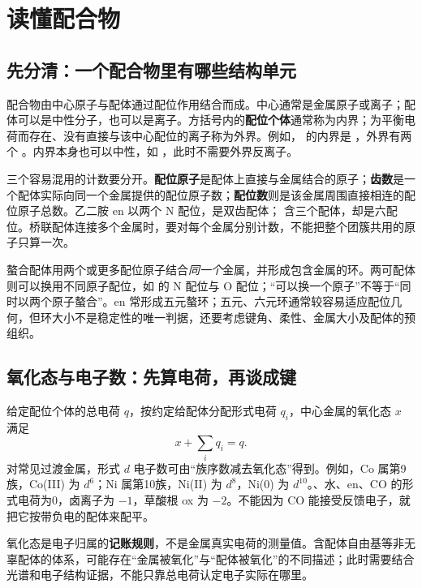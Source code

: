 \section{读懂配合物}

\subsection{先分清：一个配合物里有哪些结构单元}
配合物由中心原子与配体通过配位作用结合而成。中心通常是金属原子或离子；配体可以是中性分子，也可以是离子。方括号内的\textbf{配位个体}通常称为内界；为平衡电荷而存在、没有直接与该中心配位的离子称为外界。例如， 的内界是 ，外界有两个 。内界本身也可以中性，如 \ce{[Ni(CO)4]}，此时不需要外界反离子。

三个容易混用的计数要分开。\textbf{配位原子}是配体上直接与金属结合的原子；\textbf{齿数}是一个配体实际向同一个金属提供的配位原子数；\textbf{配位数}则是该金属周围直接相连的配位原子总数。乙二胺 en 以两个 N 配位，是双齿配体； 含三个配体，却是六配位。桥联配体连接多个金属时，要对每个金属分别计数，不能把整个团簇共用的原子只算一次。

螯合配体用两个或更多配位原子结合\emph{同一个}金属，并形成包含金属的环。两可配体则可以换用不同原子配位，如  的 N 配位与 O 配位；“可以换一个原子”不等于“同时以两个原子螯合”。en 常形成五元螯环；五元、六元环通常较容易适应配位几何，但环大小不是稳定性的唯一判据，还要考虑键角、柔性、金属大小及配体的预组织。

\subsection{氧化态与电子数：先算电荷，再谈成键}
给定配位个体的总电荷 $q$，按约定给配体分配形式电荷 $q_i$，中心金属的氧化态 $x$ 满足
\[
 x+\sum_i q_i=q.
\]
对常见过渡金属，形式 $d$ 电子数可由“族序数减去氧化态”得到。例如，Co 属第9族，Co(III) 为 $d^6$；Ni 属第10族，Ni(II) 为 $d^8$，Ni(0) 为 $d^{10}$。、水、en、CO 的形式电荷为0，卤离子为 $-1$，草酸根 ox 为 $-2$。不能因为 CO 能接受反馈电子，就把它按带负电的配体来配平。

氧化态是电子归属的\textbf{记账规则}，不是金属真实电荷的测量值。含配体自由基等非无辜配体的体系，可能存在“金属被氧化”与“配体被氧化”的不同描述；此时需要结合光谱和电子结构证据，不能只靠总电荷认定电子实际在哪里。

